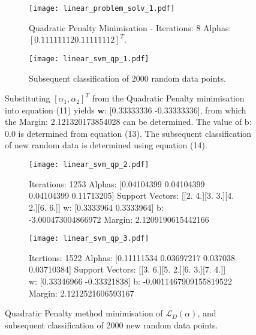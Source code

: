 \documentclass[10pt, a4paper,reqno]{amsart}
\begin{document}
\begin{figure}[H]
	\centering	
	\begin{subfigure}{1.0\textwidth}
		\centering
		\texttt{[image: linear\_problem\_solv\_1.pdf]}
		\caption{Quadratic Penalty Minimisation - Iterations: 8 Alphas: $[0.11111112 0.11111112]^T$.}
	\end{subfigure}
	\begin{subfigure}{1.0\textwidth}
		\centering
		\texttt{[image: linear\_svm\_qp\_1.pdf]}
		\caption{Subsequent classification of 2000 random data points.}
	\end{subfigure}
	\caption{Substituting $[\alpha_1, \alpha_2]^T$ from the Quadratic Penalty minimisation into equation (11) yields $\mathbf{w}$:
 [0.33333336 -0.33333336], from which the Margin: 2.121320173854028 can be determined. The value of b: 0.0 is determined from equation (13). The subsequent classification of new random data is determined using equation (14).}
\end{figure}

\begin{figure}[H]
	\centering	
	\begin{subfigure}{1.0\textwidth}
		\centering
		\texttt{[image: linear\_svm\_qp\_2.pdf]}
		\caption{Iterations: 1253 Alphas: [0.04104399 0.04104399 0.04104399 0.11713205] Support Vectors: [[2. 4.][3. 3.][4. 2.][6. 6.]] w: [0.3333964 0.3333964] b: -3.000473004866972 Margin: 2.1209190615442166}
	\end{subfigure}
	\begin{subfigure}{1.0\textwidth}
		\centering
		\texttt{[image: linear\_svm\_qp\_3.pdf]}
		\caption{Itertions: 1522 Alphas: [0.11111534 0.03697217 0.037038   0.03710384] Support Vectors: [[3. 6.][5. 2.][6. 3.][7. 4.]] w: [0.33346966 -0.33321838] b: -0.0011467909155819522 Margin: 2.1212521606593167}
	\end{subfigure}
	\caption{Quadratic Penalty method minimisation of $\mathcal{L}_D(\alpha)$, and subsequent classification of 2000 new random data points.}
\end{figure}
\end{document}
